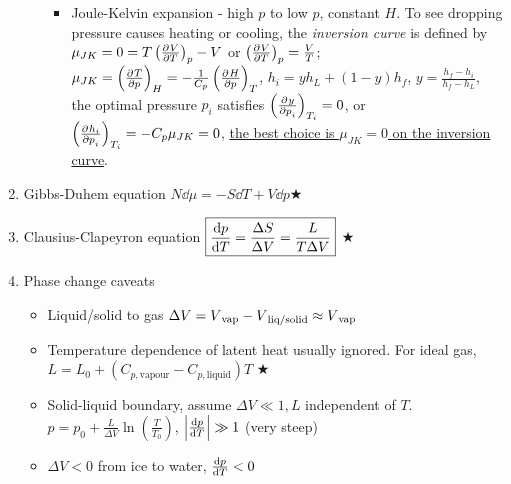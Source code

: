 \documentclass{article}
\theoremstyle{remark}
\newcommand{\mylabel}[2]{\hyperref[#1]{#2}\label{back:#1}}
\newcommand{\s}[1]{\textsubscript{#1}}
\newcommand{\ppdv}[4][]{\left(\pdv[#1]{#2}{#3}\right)_{#4}}
\begin{document}
\begin{enumerate}
\begin{itemize}
\begin{itemize}
                    \item Joule-Kelvin expansion - high $p$ to low $p$, constant $H$. To see dropping pressure causes heating or cooling,
                        the \emph{inversion curve} is defined by $\mu_{JK}=0=T\ppdv{V}{T}{p}-V$ or $\ppdv{V}{T}{p}=\frac{V}{T}$; $\mu_{JK}=\ppdv{T}{p}{H}=-\frac{1}{C_p}\ppdv{H}{p}{T}$, $h_i=yh_L+(1-y)h_f$, $y=\frac{h_f-h_i}{h_f-h_L}$, the optimal pressure $p_i$ satisfies $\ppdv{y}{p_i}{T_i}=0$, or $\ppdv{h_i}{p_i}{T_i}=-C_p\mu_{JK}=0$, \underline{the best choice is $\mu_{JK}=0$ on the inversion curve}.
                \end{itemize}
        \end{itemize}
    \item Gibbs-Duhem equation $N\dd\mu=-S\dd T+V\dd p$\mylabel{gibbs_duhem}{$\bigstar$}
    \item Clausius-Clapeyron equation $\boxed{\dv{p}{T}=\frac{\Delta S}{\Delta V}=\frac{L}{T\Delta V}}$ \mylabel{cc_equ}{$\bigstar$}
    \item Phase change caveats\begin{itemize}
            \item Liquid/solid to gas $\Delta V=V\s{vap}-V\s{liq/solid}\approx V\s{vap}$
            \item Temperature dependence of latent heat usually ignored.\newline
                    For ideal gas, $L=L_0+(C_{p,\text{vapour}}-C_{p,\text{liquid}})T$
                    \mylabel{temp_dep_latent_heat}{$\bigstar$}
            \item Solid-liquid boundary, assume $\Delta V\ll1,L$ independent of $T$.\newline
                    $p=p_0+\frac{L}{\Delta V}\ln\left(\frac{T}{T_0}\right)$, $\left|\dv{p}{T}\right|\gg1$ (very steep)
            \item $\Delta V<0$ from ice to water, $\dv{p}{T}<0$
        \end{itemize}
\end{enumerate}
\end{document}
